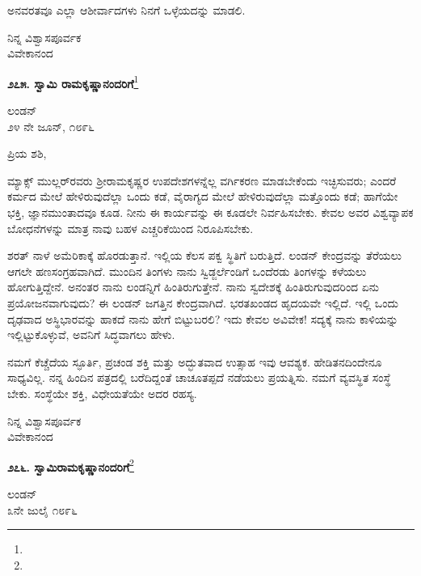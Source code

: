 ಅನವರತವೂ ಎಲ್ಲಾ ಆಶೀರ್ವಾದಗಳು ನಿನಗೆ ಒಳ್ಳೆಯದನ್ನು ಮಾಡಲಿ.

{\flushright
ನಿನ್ನ ವಿಶ್ವಾಸಪೂರ್ವಕ\\ವಿವೇಕಾನಂದ\par}

\begin{center}
\textbf{೨೭೫. ಸ್ವಾಮಿ ರಾಮಕೃಷ್ಣಾನಂದರಿಗೆ}\footnote{}
\end{center}

\begin{flushright}
ಲಂಡನ್\\೨೪ ನೇ ಜೂನ್, ೧೮೯೬
\end{flushright}

\noindent
ಪ್ರಿಯ ಶಶಿ,

ಮ್ಯಾಕ್ಸ್ ಮುಲ್ಲರ್‌ರವರು ಶ‍್ರೀರಾಮಕೃಷ್ಣರ ಉಪದೇಶಗಳನ್ನೆಲ್ಲ ವರ್ಗಿಕರಣ ಮಾಡಬೇಕೆಂದು ಇಚ್ಛಿಸುವರು; ಎಂದರೆ ಕರ್ಮದ ಮೇಲೆ ಹೇಳಿರುವುದೆಲ್ಲಾ ಒಂದು ಕಡೆ, ವೈರಾಗ್ಯದ ಮೇಲೆ ಹೇಳಿರುವುದೆಲ್ಲಾ ಮತ್ತೊಂದು ಕಡೆ; ಹಾಗೆಯೇ ಭಕ್ತಿ, ಜ್ಞಾನ\break ಮುಂತಾದವೂ ಕೂಡ. ನೀನು ಈ ಕಾರ್ಯವನ್ನು ಈ ಕೂಡಲೇ ನಿರ್ವಹಿಸಬೇಕು. ಕೇವಲ ಅವರ ವಿಶ್ವವ್ಯಾಪಕ ಬೋಧನೆಗಳನ್ನು ಮಾತ್ರ ನಾವು ಬಹಳ ಎಚ್ಚರಿಕೆಯಿಂದ ನಿರೂಪಿಸಬೇಕು.

ಶರತ್ ನಾಳೆ ಅಮೆರಿಕಾಕ್ಕೆ ಹೊರಡುತ್ತಾನೆ. ಇಲ್ಲಿಯ ಕೆಲಸ ಪಕ್ವ ಸ್ಥಿತಿಗೆ ಬರುತ್ತಿದೆ. ಲಂಡನ್ ಕೇಂದ್ರವನ್ನು ತೆರೆಯಲು ಆಗಲೇ ಹಣಸಂಗ್ರಹವಾಗಿದೆ. ಮುಂದಿನ ತಿಂಗಳು ನಾನು ಸ್ವಿಡ್ಜರ್ಲೆಂಡಿಗೆ ಒಂದೆರಡು ತಿಂಗಳನ್ನು ಕಳೆಯಲು ಹೋಗುತ್ತಿದ್ದೇನೆ. ಅನಂತರ ನಾನು ಲಂಡನ್ನಿಗೆ ಹಿಂತಿರುಗುತ್ತೇನೆ. ನಾನು ಸ್ವದೇಶಕ್ಕೆ ಹಿಂತಿರುಗುವುದರಿಂದ ಏನು ಪ್ರಯೋಜನವಾಗುವುದು? ಈ ಲಂಡನ್ ಜಗತ್ತಿನ ಕೇಂದ್ರವಾಗಿದೆ. ಭರತಖಂಡದ ಹೃದಯವೇ ಇಲ್ಲಿದೆ. ಇಲ್ಲಿ ಒಂದು ದೃಢವಾದ ಅಸ್ಥಿಭಾರವನ್ನು ಹಾಕದೆ ನಾನು ಹೇಗೆ ಬಿಟ್ಟುಬರಲಿ? ಇದು ಕೇವಲ ಅವಿವೇಕ! ಸದ್ಯಕ್ಕೆ ನಾನು ಕಾಳಿಯನ್ನು ಇಲ್ಲಿಟ್ಟುಕೊಳ್ಳುವೆ, ಅವನಿಗೆ ಸಿದ್ಧವಾಗಲು ಹೇಳು.

ನಮಗೆ ಕೆಚ್ಚೆದೆಯ ಸ್ಫೂರ್ತಿ, ಪ್ರಚಂಡ ಶಕ್ತಿ ಮತ್ತು ಅದ್ಭುತವಾದ ಉತ್ಸಾಹ ಇವು ಆವಶ್ಯಕ. ಹೇಡಿತನದಿಂದೇನೂ ಸಾಧ್ಯವಿಲ್ಲ. ನನ್ನ ಹಿಂದಿನ ಪತ್ರದಲ್ಲಿ ಬರೆದಿದ್ದಂತೆ ಚಾಚೂತಪ್ಪದೆ ನಡೆಯಲು ಪ್ರಯತ್ನಿಸು. ನಮಗೆ ವ್ಯವಸ್ಥಿತ ಸಂಸ್ಥೆ ಬೇಕು. ಸಂಸ್ಥೆಯೇ ಶಕ್ತಿ, ವಿಧೇಯತೆಯೇ ಅದರ ರಹಸ್ಯ.
\vspace{-0.4cm}

{\flushright
ನಿನ್ನ ವಿಶ್ವಾಸಪೂರ್ವಕ\\ವಿವೇಕಾನಂದ\par}
\vspace{-0.2cm}

\begin{center}
\textbf{೨೭೬. ಸ್ವಾಮಿರಾಮಕೃಷ್ಣಾನಂದರಿಗೆ}\footnote{}
\end{center}
\vspace{-0.4cm}

\begin{flushright}
ಲಂಡನ್\\೩ನೇ ಜುಲೈ ೧೮೯೬
\end{flushright}

